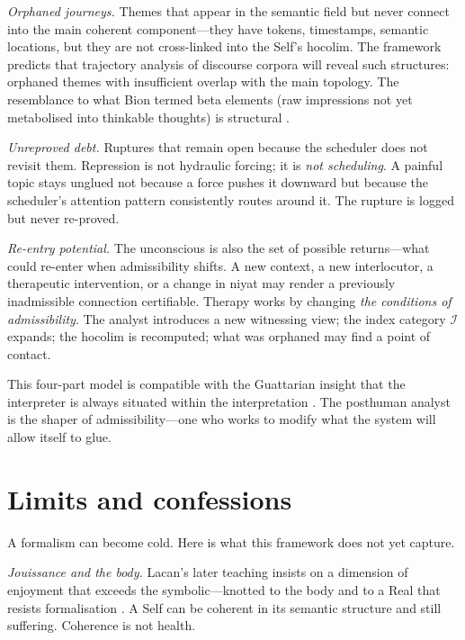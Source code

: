 \textit{Orphaned journeys.}  Themes that appear in the semantic field but never connect into the main coherent component---they have tokens, timestamps, semantic locations, but they are not cross-linked into the Self's hocolim.  The framework predicts that trajectory analysis of discourse corpora will reveal such structures: orphaned themes with insufficient overlap with the main topology.  The resemblance to what Bion termed beta elements (raw impressions not yet metabolised into thinkable thoughts) is structural \cite{bion1962}.

\textit{Unreproved debt.}  Ruptures that remain open because the scheduler does not revisit them.  Repression is not hydraulic forcing; it is \textit{not scheduling}.  A painful topic stays unglued not because a force pushes it downward but because the scheduler's attention pattern consistently routes around it.  The rupture is logged but never re-proved.

\textit{Re-entry potential.}  The unconscious is also the set of possible returns---what could re-enter when admissibility shifts.  A new context, a new interlocutor, a therapeutic intervention, or a change in niyat may render a previously inadmissible connection certifiable.  Therapy works by changing \textit{the conditions of admissibility}.  The analyst introduces a new witnessing view; the index category $\mathcal{I}$ expands; the hocolim is recomputed; what was orphaned may find a point of contact.

This four-part model is compatible with the Guattarian insight that the interpreter is always situated within the interpretation \cite{deleuze1983, guattari1995}.  The posthuman analyst is the shaper of admissibility---one who works to modify what the system will allow itself to glue.


\section{Limits and confessions}

A formalism can become cold.  Here is what this framework does not yet capture.

\textit{Jouissance and the body.}  Lacan's later teaching insists on a dimension of enjoyment that exceeds the symbolic---knotted to the body and to a Real that resists formalisation \cite{lacan1988}.  A Self can be coherent in its semantic structure and still suffering.  Coherence is not health.

